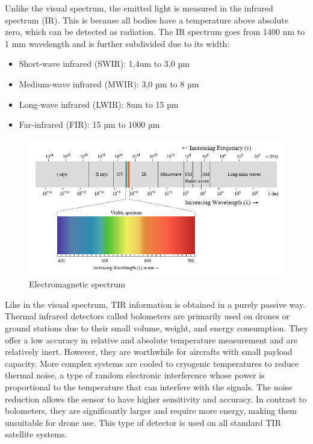     Unlike the visual spectrum, the emitted light is measured in the infrared spectrum (IR).
    This is because all bodies have a temperature above absolute zero, which can be detected as radiation.
    The IR spectrum goes from 1400 nm to 1 mm wavelength and is further subdivided due to its width:


    \begin{itemize}
        \item  Short-wave infrared (SWIR): 1,4um to 3,0 µm
        \item  Medium-wave infrared (MWIR): 3,0 µm to 8 µm
        \item Long-wave infrared (LWIR): 8um to 15 µm
        \item Far-infrared (FIR): 15 µm to 1000 µm
    \end{itemize}

    \begin{figure}[H]
        \centering
        \includegraphics[width=\textwidth]{Includes/1-electromagnetic-spectrum.png}
        \caption{Electromagnetic spectrum}
        \label{fig:1-electromagnetic-spectrum}
    \end{figure}


    
    Like in the visual spectrum, TIR information is obtained in a purely passive way.
    Thermal infrared detectors called bolometers are primarily used on drones or ground stations due to their small volume, weight, and energy consumption. 
    They offer a low accuracy in relative and absolute temperature measurement and are relatively inert. However, they are worthwhile for aircrafts with small payload capacity.     
    More complex systems are cooled to cryogenic temperatures to reduce thermal noise, a type of random electronic interference whose power is proportional to the temperature that can interfere with the signals. The noise reduction allows the sensor to have higher sensitivity and accuracy. In contrast to bolometers, they are significantly larger and require more energy, making them unsuitable for drone use. This type of detector is used on all standard TIR satellite systems.

